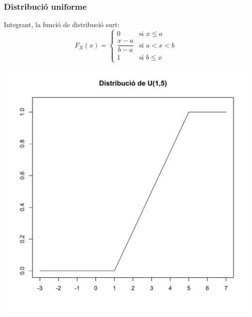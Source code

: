 \documentclass[12pt,t]{beamer}\usepackage[]{graphicx}\usepackage[]{color}
\renewcommand{\leq}{\leqslant}
\theoremstyle{plain}
\theoremstyle{definition}
\begin{document}
 
\begin{frame} 
\frametitle{Distribució uniforme}
\vspace*{-1ex}

Integrant, la funció de distribució surt:
$$
F_X(x)=\left\{\begin{array}{ll} 0  & \mbox{si } x\leq a\\
\dfrac{x-a}{b-a} & \mbox{si } a<x<b\\ 1  & \mbox{si } b\leq x
\end{array}
\right. 
$$
\vspace*{-3ex}

\begin{center}
\includegraphics[width=0.625\linewidth]{punif15}
\end{center}



\end{frame}
\end{document}
